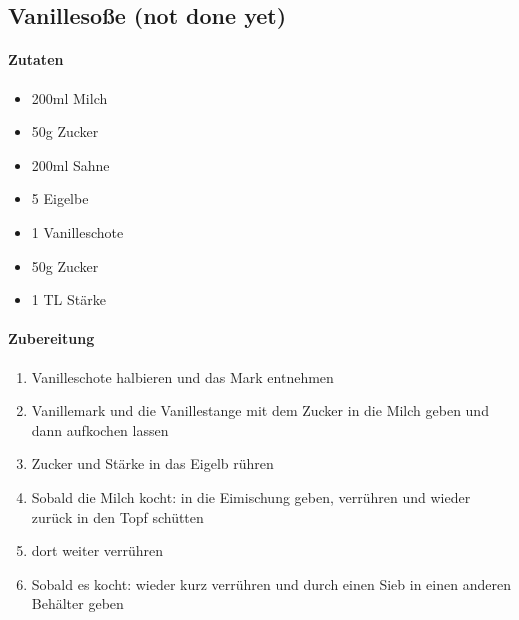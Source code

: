 \newpage
\subsection{Vanillesoße (not done yet)}
\paragraph{Zutaten}
\begin{itemize}[noitemsep]
	\item 200ml Milch
	\item 50g Zucker
	\item 200ml Sahne
	\item 5 Eigelbe
	\item 1 Vanilleschote
	\item 50g Zucker
	\item 1 TL Stärke
\end{itemize}
\paragraph{Zubereitung}
\begin{enumerate}[noitemsep]
	\item Vanilleschote halbieren und das Mark entnehmen
	\item Vanillemark und die Vanillestange mit dem Zucker in die Milch geben und dann aufkochen lassen 
	\item Zucker und Stärke in das Eigelb rühren
	\item Sobald die Milch kocht: in die Eimischung geben, verrühren und wieder zurück in den Topf schütten 
	\item dort weiter verrühren
	\item Sobald es kocht: wieder kurz verrühren und durch einen Sieb in einen anderen Behälter geben 
\end{enumerate}